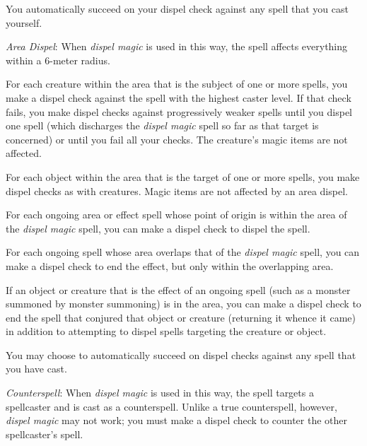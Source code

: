 {	You automatically succeed on your dispel check against any spell that you cast yourself.

	\textit{Area Dispel}:
	When \emph{dispel magic} is used in this way, the spell affects everything within a 6-meter radius.

	For each creature within the area that is the subject of one or more spells, you make a dispel check against the spell with the highest caster level. If that check fails, you make dispel checks against progressively weaker spells until you dispel one spell (which discharges the \emph{dispel magic} spell so far as that target is concerned) or until you fail all your checks. The creature's magic items are not affected.

	For each object within the area that is the target of one or more spells, you make dispel checks as with creatures. Magic items are not affected by an area dispel.

	For each ongoing area or effect spell whose point of origin is within the area of the \emph{dispel magic} spell, you can make a dispel check to dispel the spell.

	For each ongoing spell whose area overlaps that of the \emph{dispel magic} spell, you can make a dispel check to end the effect, but only within the overlapping area.

	If an object or creature that is the effect of an ongoing spell (such as a monster summoned by monster summoning) is in the area, you can make a dispel check to end the spell that conjured that object or creature (returning it whence it came) in addition to attempting to dispel spells targeting the creature or object.

	You may choose to automatically succeed on dispel checks against any spell that you have cast.

	\textit{Counterspell}:
	When \emph{dispel magic} is used in this way, the spell targets a spellcaster and is cast as a counterspell. Unlike a true counterspell, however, \emph{dispel magic} may not work; you must make a dispel check to counter the other spellcaster's spell.

}
